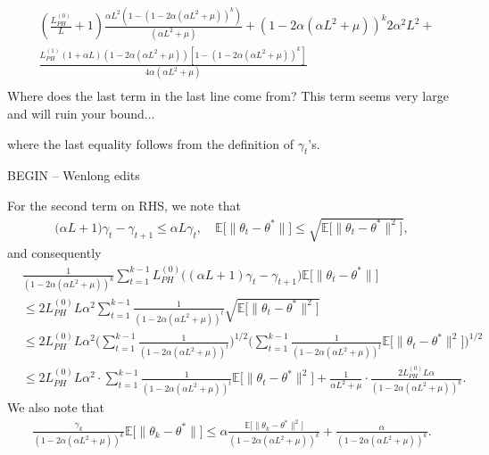 \documentclass[a4paper]{article}
\newcommand{\norm}[1]{\|#1 \|}
\newcommand{\Exs}{\mathbb{E}}
\newcommand{\thetastar}{\theta^*}
\newcommand{\constLPH}[1]{L_{PH}^{(#1)}}
\newcommand{\mwlcomment}[1]{{\color{orange} #1}}
\newcommand{\stepsize}{\alpha}
\begin{document}
\begin{equation}
\begin{split}
		& \left(\frac{L_{PH}^{(0)}}{L} + 1\right)\frac{\alpha L^{2}\left(1 - \left(1 - 2\alpha\left(\alpha L^{2} + \mu\right)\right)^{k}\right)}{\left(\alpha L^{2} + \mu\right)} + \left(1 - 2\alpha\left(\alpha L^{2} + \mu\right)\right)^{k}2\alpha^{2}L^{2} +\\
		& \frac{L_{PH}^{(1)}\left(1 + \alpha L\right)\left(1 - 2\alpha\left(\alpha L^{2} + \mu\right)\right)\left[1 - \left(1 - 2\alpha\left(\alpha L^{2} + \mu\right)\right)^{k}\right]}{4\alpha\left(\alpha L^{2} + \mu\right)}\\
	\end{split}
\end{equation}
\mwlcomment{Where does the last term in the last line come from? This term seems very large and will ruin your bound...}

where the last equality follows from the definition of $\gamma_{t}$'s.




\mwlcomment{BEGIN -- Wenlong edits}

For the second term on RHS, we note that
\begin{align*}
	\big( \stepsize L + 1 \big) \gamma_{t} - \gamma_{t + 1} \leq \stepsize L \gamma_{t}, \quad \Exs  \big[ \norm{\theta_{t} - \thetastar} \big] \leq \sqrt{ \Exs \big[ \norm{\theta_{t} - \thetastar}^2 \big]},
\end{align*}
and consequently
\begin{align*}
	&\frac{1}{(1 - 2 \stepsize (\stepsize L^2 + \mu))^k} \sum_{t = 1}^{k - 1} \constLPH{0} \big( (\stepsize L + 1) \gamma_{t} - \gamma_{t + 1}\big)\Exs \big[ \norm{\theta_{t} - \thetastar} \big] \\
	&\leq 2 \constLPH{0} L \stepsize^2  \sum_{t = 1}^{k - 1} \frac{1}{(1 - 2 \stepsize (\stepsize L^2 + \mu))^t} \sqrt{\Exs \big[ \norm{\theta_{t} - \thetastar}^2 \big]}\\
	&\leq 2 \constLPH{0} L \stepsize^2  \Big(  \sum_{t = 1}^{k - 1} \frac{1}{(1 - 2 \stepsize (\stepsize L^2 + \mu))^t} \Big)^{1/2} \Big( \sum_{t = 1}^{k - 1} \frac{1}{(1 - 2 \stepsize (\stepsize L^2 + \mu))^t} \Exs \big[ \norm{\theta_{t} - \thetastar}^2 \big] \Big)^{1/2}\\
	&\leq 2 \constLPH{0} L \stepsize^2 \cdot \sum_{t = 1}^{k - 1} \frac{1}{(1 - 2 \stepsize (\stepsize L^2 + \mu))^t} \Exs \big[ \norm{\theta_{t} - \thetastar}^2 \big] + \frac{1}{\alpha L^{2} + \mu} \cdot \frac{2 \constLPH{0} L \stepsize}{(1 - 2 \stepsize (\stepsize L^2 + \mu))^k}.
\end{align*}
We also note that
\begin{align*}
	\frac{\gamma_k}{(1 - 2 \stepsize (\stepsize L^2 + \mu))^k} \Exs \big[ \norm{\theta_k - \thetastar} \big] \leq \stepsize \frac{\Exs \big[ \norm{\theta_k - \thetastar}^2 \big]}{(1 - 2 \stepsize (\stepsize L^2 + \mu))^k} + \frac{\stepsize}{(1 - 2 \stepsize (\stepsize L^2 + \mu))^k}.
\end{align*}
\end{document}
